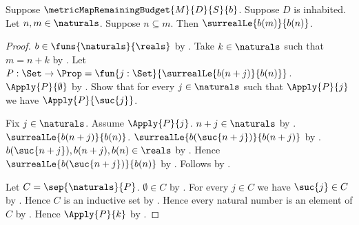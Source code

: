\begin{theorem}\label{metric_map_budget_antitone}
    Suppose $\metricMapRemainingBudget{M}{D}{S}{b}$.
    Suppose $D$ is inhabited.
    Let $n,m\in\naturals$.
    Suppose $n\subseteq m$.
    Then $\surrealLe{b(m)}{b(n)}$.
\end{theorem}
\begin{proof}
    $b\in\funs{\naturals}{\reals}$
        by .
    Take $k\in\naturals$ such that $m=n+k$
        by .
    Let $P:\Set\to\Prop=\fun{j:\Set}{
        \surrealLe{b(n+j)}{b(n)}}$.
    $\Apply{P}{\emptyset}$
        by
        .
    Show that for every $j\in\naturals$ such that $\Apply{P}{j}$
        we have $\Apply{P}{\suc{j}}$.
    \begin{subproof}
        Fix $j\in\naturals$.
        Assume $\Apply{P}{j}$.
        $n+j\in\naturals$ by .
        $\surrealLe{b(n+j)}{b(n)}$.
        $\surrealLe{b(\suc{n+j})}{b(n+j)}$
            by .
        $b(\suc{n+j}),b(n+j),b(n)\in\reals$
            by .
        Hence $\surrealLe{b(\suc{n+j})}{b(n)}$
            by
            .
        Follows by .
    \end{subproof}
    Let $C=\sep{\naturals}{P}$.
    $\emptyset\in C$ by .
    For every $j\in C$ we have $\suc{j}\in C$
        by .
    Hence $C$ is an inductive set by .
    Hence every natural number is an element of $C$
        by .
    Hence $\Apply{P}{k}$ by .
\end{proof}

